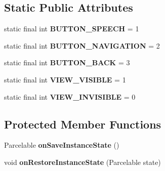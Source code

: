 \subsection*{Static Public Attributes}
\begin{DoxyCompactItemize}
\item 
\mbox{\label{classcom_1_1example_1_1searchwidget_1_1_search_bar_ae139a32ab2444cb37c5d6b79cae9260a}} 
static final int {\bfseries B\+U\+T\+T\+O\+N\+\_\+\+S\+P\+E\+E\+CH} = 1
\item 
\mbox{\label{classcom_1_1example_1_1searchwidget_1_1_search_bar_a211b332dd33cb120cc2fedcb863305db}} 
static final int {\bfseries B\+U\+T\+T\+O\+N\+\_\+\+N\+A\+V\+I\+G\+A\+T\+I\+ON} = 2
\item 
\mbox{\label{classcom_1_1example_1_1searchwidget_1_1_search_bar_aa1da6582751136cdfc8e8a70b397ddec}} 
static final int {\bfseries B\+U\+T\+T\+O\+N\+\_\+\+B\+A\+CK} = 3
\item 
\mbox{\label{classcom_1_1example_1_1searchwidget_1_1_search_bar_a921fb67210beb96c881b3b5c251c44c1}} 
static final int {\bfseries V\+I\+E\+W\+\_\+\+V\+I\+S\+I\+B\+LE} = 1
\item 
\mbox{\label{classcom_1_1example_1_1searchwidget_1_1_search_bar_a9be22df277227d2baaa1ebe3a3addc4c}} 
static final int {\bfseries V\+I\+E\+W\+\_\+\+I\+N\+V\+I\+S\+I\+B\+LE} = 0
\end{DoxyCompactItemize}
\subsection*{Protected Member Functions}
\begin{DoxyCompactItemize}
\item 
\mbox{\label{classcom_1_1example_1_1searchwidget_1_1_search_bar_ac12f3725e2896a793e6b726c5bbb8a80}} 
Parcelable {\bfseries on\+Save\+Instance\+State} ()
\item 
\mbox{\label{classcom_1_1example_1_1searchwidget_1_1_search_bar_a068a22be59a7fac18f7797c4e499be74}} 
void {\bfseries on\+Restore\+Instance\+State} (Parcelable state)
\end{DoxyCompactItemize}


